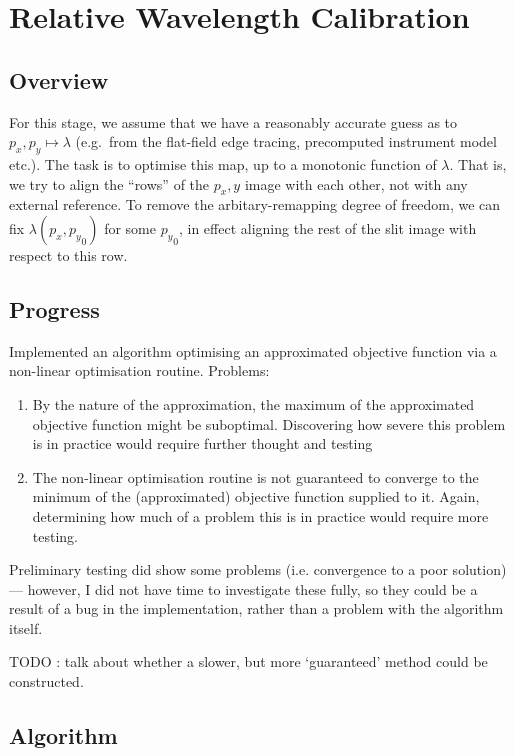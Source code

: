 \section{Relative Wavelength Calibration}

\subsection{Overview}

For this stage, we assume that we have a reasonably accurate guess as
to $p_x, p_y \mapsto \lambda$ (e.g.\ from the flat-field edge tracing,
precomputed instrument model etc.). The task is to optimise this map,
up to a monotonic function of $\lambda$. That is,
we try to align the ``rows'' of the $p_x, y$ image with each other, not
with any external reference. To remove the arbitary-remapping degree
of freedom, we can fix $\lambda(p_x, {p_y}_0)$ for some ${p_y}_0$, in
effect aligning the rest of the slit image with respect to this row.

\subsection{Progress}

Implemented an algorithm optimising an approximated objective function via
a non-linear optimisation routine. Problems:
\begin{enumerate}
\item By the nature of the approximation, the maximum of the
approximated objective function might be suboptimal. Discovering how
severe this problem is in practice would require further thought and
testing
\item The non-linear optimisation routine is not guaranteed to converge
to the minimum of the (approximated) objective function supplied to
it. Again, determining how much of a problem this is in practice would
require more testing.
\end{enumerate}
Preliminary testing did show some problems (i.e. convergence to a poor
solution) --- however, I did not have time to investigate these fully,
so they could be a result of a bug in the implementation, rather than
a problem with the algorithm itself.

TODO : talk about whether a slower, but more `guaranteed' method could
be constructed.

\subsection{Algorithm}

